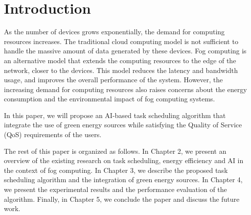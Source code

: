 \chapter*{Introduction}

As the number of devices grows exponentially, the demand for computing resources increases. The traditional cloud
computing model is not sufficient to handle the massive amount of data generated by these devices. Fog computing is an
alternative model that extends the computing resources to the edge of the network, closer to the devices. This model
reduces the latency and bandwidth usage, and improves the overall performance of the system. However, the increasing
demand for computing resources also raises concerns about the energy consumption and the environmental impact of fog
computing systems.

In this paper, we will propose an AI-based task scheduling algorithm that integrate the use of green energy sources
while satisfying the Quality of Service (QoS) requirements of the users.

The rest of this paper is organized as follows. In Chapter 2, we present an overview of the
existing research on task scheduling, energy efficiency and AI in the context of fog computing. In Chapter 3, we
describe the proposed task scheduling algorithm and the integration of green energy sources. In Chapter 4, we present
the experimental results and the performance evaluation of the algorithm. Finally, in Chapter 5, we conclude the paper
and discuss the future work.